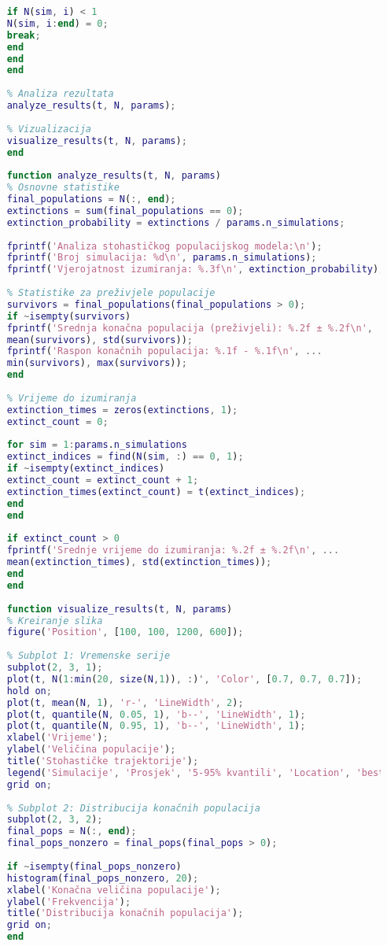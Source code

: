 \documentclass[11pt,oneside]{book}
\begin{document}
\begin{lstlisting}[language=Matlab, caption=Stohastički populacijski model u Octave]
	% Provjera izumiranja
	if N(sim, i) < 1
	N(sim, i:end) = 0;
	break;
	end
	end
	end
	
	% Analiza rezultata
	analyze_results(t, N, params);
	
	% Vizualizacija
	visualize_results(t, N, params);
	end
	
	function analyze_results(t, N, params)
	% Osnovne statistike
	final_populations = N(:, end);
	extinctions = sum(final_populations == 0);
	extinction_probability = extinctions / params.n_simulations;
	
	fprintf('Analiza stohastičkog populacijskog modela:\n');
	fprintf('Broj simulacija: %d\n', params.n_simulations);
	fprintf('Vjerojatnost izumiranja: %.3f\n', extinction_probability);
	
	% Statistike za preživjele populacije
	survivors = final_populations(final_populations > 0);
	if ~isempty(survivors)
	fprintf('Srednja konačna populacija (preživjeli): %.2f ± %.2f\n', ...
	mean(survivors), std(survivors));
	fprintf('Raspon konačnih populacija: %.1f - %.1f\n', ...
	min(survivors), max(survivors));
	end
	
	% Vrijeme do izumiranja
	extinction_times = zeros(extinctions, 1);
	extinct_count = 0;
	
	for sim = 1:params.n_simulations
	extinct_indices = find(N(sim, :) == 0, 1);
	if ~isempty(extinct_indices)
	extinct_count = extinct_count + 1;
	extinction_times(extinct_count) = t(extinct_indices);
	end
	end
	
	if extinct_count > 0
	fprintf('Srednje vrijeme do izumiranja: %.2f ± %.2f\n', ...
	mean(extinction_times), std(extinction_times));
	end
	end
	
	function visualize_results(t, N, params)
	% Kreiranje slika
	figure('Position', [100, 100, 1200, 600]);
	
	% Subplot 1: Vremenske serije
	subplot(2, 3, 1);
	plot(t, N(1:min(20, size(N,1)), :)', 'Color', [0.7, 0.7, 0.7]);
	hold on;
	plot(t, mean(N, 1), 'r-', 'LineWidth', 2);
	plot(t, quantile(N, 0.05, 1), 'b--', 'LineWidth', 1);
	plot(t, quantile(N, 0.95, 1), 'b--', 'LineWidth', 1);
	xlabel('Vrijeme');
	ylabel('Veličina populacije');
	title('Stohastičke trajektorije');
	legend('Simulacije', 'Prosjek', '5-95% kvantili', 'Location', 'best');
	grid on;
	
	% Subplot 2: Distribucija konačnih populacija
	subplot(2, 3, 2);
	final_pops = N(:, end);
	final_pops_nonzero = final_pops(final_pops > 0);
	
	if ~isempty(final_pops_nonzero)
	histogram(final_pops_nonzero, 20);
	xlabel('Konačna veličina populacije');
	ylabel('Frekvencija');
	title('Distribucija konačnih populacija');
	grid on;
	end
	

\end{lstlisting}
\end{document}
